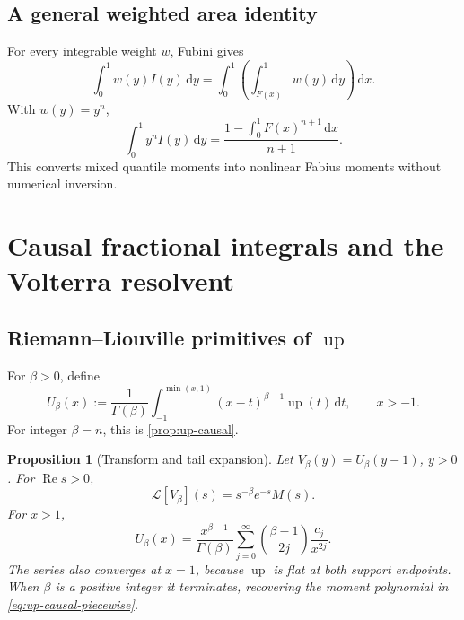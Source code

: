 \documentclass[11pt]{article}
\newtheorem{proposition}[theorem]{Proposition}
\theoremstyle{definition}
\theoremstyle{remark}
\DeclareMathOperator{\upf}{up}
\DeclareMathOperator{\RePart}{Re}
\newcommand{\dd}{\,\mathrm d}
\newcommand{\Lap}{\mathcal L}
\begin{document}
\subsection{A general weighted area identity}

For every integrable weight \(w\), Fubini gives
\begin{equation}
 \int_0^1w(y)I(y)\dd y
 =\int_0^1\left(\int_{F(x)}^1w(y)\dd y\right)\dd x.        \label{eq:weighted-area-inverse}
\end{equation}
With \(w(y)=y^n\),
\begin{equation}
 \int_0^1y^nI(y)\dd y
 =\frac{1-\int_0^1F(x)^{n+1}\dd x}{n+1}.                 \label{eq:inverse-y-moment}
\end{equation}
This converts mixed quantile moments into nonlinear Fabius moments without numerical
inversion.

\section{Causal fractional integrals and the Volterra resolvent}

\subsection{Riemann--Liouville primitives of \(\upf\)}

For \(\beta>0\), define
\begin{equation}
 U_\beta(x):=\frac1{\Gamma(\beta)}
 \int_{-1}^{\min(x,1)}(x-t)^{\beta-1}\upf(t)\dd t,
 \qquad x>-1.                                             \label{eq:fractional-up}
\end{equation}
For integer \(\beta=n\), this is \cref{prop:up-causal}.

\begin{proposition}[Transform and tail expansion]
\label{prop:fractional-up-transform}
Let \(V_\beta(y)=U_\beta(y-1)\), \(y>0\).  For \(\RePart s>0\),
\begin{equation}
 \Lap[V_\beta](s)=s^{-\beta}e^{-s}M(s).                   \label{eq:fractional-up-laplace}
\end{equation}
For \(x>1\),
\begin{equation}
 U_\beta(x)=\frac{x^{\beta-1}}{\Gamma(\beta)}
 \sum_{j=0}^{\infty}\binom{\beta-1}{2j}\frac{c_j}{x^{2j}}. \label{eq:fractional-tail}
\end{equation}
The series also converges at \(x=1\), because \(\upf\) is flat at both support
endpoints.  When \(\beta\) is a positive integer it terminates, recovering the moment
polynomial in \eqref{eq:up-causal-piecewise}.
\end{proposition}
\end{document}
